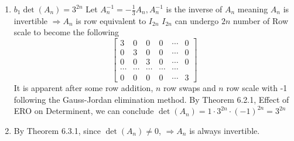 \documentclass[11pt]{article}
\begin{document}
\begin{enumerate}[{\bf Q1.}]
\begin{enumerate}
			\item 
			$b_1 \operatorname{det}\left(A_n\right)=3^{2 n}$
			Let $A_n^{-1}=-\frac{1}{3} A_n, A_n^{-1}$ is the inverse of $A_n$ meaning $A_n$ is invertible \newline
			$\Rightarrow A_n$ is row equivalent to $I_{2 n}$ \newline
			$I_{2 n}$ can undergo $2 n$ number of Row scale to become the following
			$$
			\left[\begin{array}{cccccc}
			3 & 0 & 0 & 0 & \cdots & 0 \\
			0 & 3 & 0 & 0 & \cdots & 0 \\
			0 & 0 & 3 & 0 & \cdots & 0 \\
			\cdots & \cdots & \cdots & \cdots & \cdots \\
			0 & 0 & 0 & 0 & \cdots & 3
			\end{array}\right]
			$$
			It is apparent after some row addition, $n$ row swaps and $n$ row scale with -1 following the Gauss-Jordan elimination method. \newline
			By Theorem 6.2.1, Effect of ERO on
			Determinent, we can conclude $\operatorname{det}\left(A_n\right)=1 \cdot 3^{2 n} \cdot(-1)^{2 n}=3^{2 n}$
			\item 
			By Theorem 6.3.1, since $\operatorname{det}\left(A_n\right) \neq 0$, \newline
			$\Rightarrow A_n$ is always invertible.

		\end{enumerate}
		
		\newpage
		

\end{enumerate}
\end{document}
